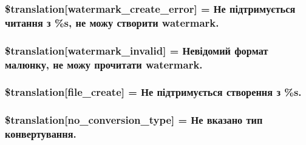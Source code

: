 \subsubsection[{\$translation}]{\setlength{\rightskip}{0pt plus 5cm}\$translation\mbox{[}\textquotesingle{}watermark\+\_\+create\+\_\+error\textquotesingle{}\mbox{]} = \textquotesingle{}Не підтримується читання з \%s, не можу створити watermark.\textquotesingle{}}\label{class_8upload_8uk___u_a_8php_aabca0b65dadbc6184415c16375f284ca}
\hypertarget{class_8upload_8uk___u_a_8php_ac336e7a5701e47ba4a05e9e498a3cc44}{}
\subsubsection[{\$translation}]{\setlength{\rightskip}{0pt plus 5cm}\$translation\mbox{[}\textquotesingle{}watermark\+\_\+invalid\textquotesingle{}\mbox{]} = \textquotesingle{}Невідомий формат малюнку, не можу прочитати watermark.\textquotesingle{}}\label{class_8upload_8uk___u_a_8php_ac336e7a5701e47ba4a05e9e498a3cc44}
\hypertarget{class_8upload_8uk___u_a_8php_a1ecb4673e4fb69e06b3f20b65cecf30a}{}
\subsubsection[{\$translation}]{\setlength{\rightskip}{0pt plus 5cm}\$translation\mbox{[}\textquotesingle{}file\+\_\+create\textquotesingle{}\mbox{]} = \textquotesingle{}Не підтримується створення з \%s.\textquotesingle{}}\label{class_8upload_8uk___u_a_8php_a1ecb4673e4fb69e06b3f20b65cecf30a}
\hypertarget{class_8upload_8uk___u_a_8php_a4712d7ec28e9a7f17eb3338af2358363}{}
\subsubsection[{\$translation}]{\setlength{\rightskip}{0pt plus 5cm}\$translation\mbox{[}\textquotesingle{}no\+\_\+conversion\+\_\+type\textquotesingle{}\mbox{]} = \textquotesingle{}Не вказано тип конвертування.\textquotesingle{}}\label{class_8upload_8uk___u_a_8php_a4712d7ec28e9a7f17eb3338af2358363}
\hypertarget{class_8upload_8uk___u_a_8php_a783c9358bcf54a054545b50098bc679b}{}
